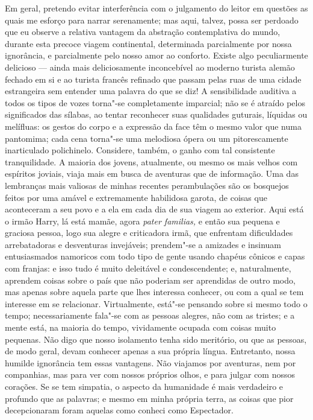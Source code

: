 Em geral, pretendo evitar interferência com o julgamento do leitor
em questões as quais me esforço para narrar serenamente; mas aqui,
talvez, possa ser perdoado que eu observe a relativa vantagem da
abstração contemplativa do mundo, durante esta precoce viagem
continental, determinada parcialmente por nossa ignorância, e
parcialmente pelo nosso amor ao conforto. Existe algo peculiarmente
delicioso --- ainda mais deliciosamente inconcebível ao moderno turista
alemão fechado em si e ao turista francês refinado que passam pelas ruas
de uma cidade estrangeira sem entender uma palavra do que se diz! A
sensibilidade auditiva a todos os tipos de vozes torna"-se completamente
imparcial; não se é atraído pelos significados das sílabas, ao tentar
reconhecer suas qualidades guturais, líquidas ou melífluas: os gestos do
corpo e a expressão da face têm o mesmo valor que numa pantomima; cada
cena torna"-se uma melodiosa ópera ou um pitorescamente inarticulado
polichinelo. Considere, também, o ganho com tal consistente
tranquilidade. A maioria dos jovens, atualmente, ou mesmo os mais velhos
com espíritos joviais, viaja mais em busca de aventuras que de
informação. Uma das lembranças mais valiosas de minhas recentes
perambulações são os bosquejos feitos por uma amável e extremamente
habilidosa garota, de coisas que aconteceram a seu povo e a ela em cada
dia de sua viagem ao exterior. Aqui está o irmão Harry, lá está mamãe,
agora \textit{pater familias,} e então sua pequena e graciosa pessoa, logo
sua alegre e criticadora irmã, que enfrentam dificuldades arrebatadoras
e desventuras invejáveis; prendem"-se a amizades e insinuam entusiasmados
namoricos com todo tipo de gente usando chapéus cônicos e capas com
franjas: e isso tudo é muito deleitável e condescendente; e,
naturalmente, aprendem coisas sobre o país que não poderiam ser
aprendidas de outro modo, mas apenas sobre aquela parte que lhes
interessa conhecer, ou com a qual se tem interesse em se relacionar.
Virtualmente, está"-se pensando sobre si mesmo todo o tempo;
necessariamente fala"-se com as pessoas alegres, não com as tristes; e a
mente está, na maioria do tempo, vividamente ocupada com coisas muito
pequenas. Não digo que nosso isolamento tenha sido meritório, ou que as
pessoas, de modo geral, devam conhecer apenas a sua própria língua.
Entretanto, nossa humilde ignorância tem essas vantagens. Não viajamos
por aventuras, nem por companhias, mas para ver com nossos próprios
olhos, e para julgar com nossos corações. Se se tem simpatia, o aspecto
da humanidade é mais verdadeiro e profundo que as palavras; e mesmo em
minha própria terra, as coisas que pior decepcionaram foram aquelas como
conheci como Espectador.

